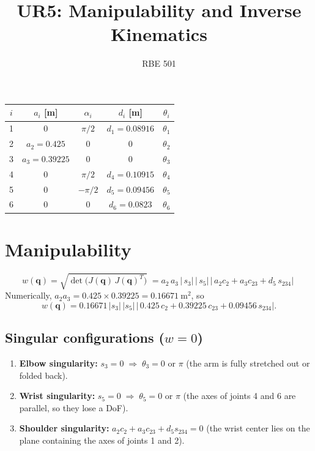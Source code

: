 \documentclass[11pt]{article}
\title{UR5: Manipulability and Inverse Kinematics}
\author{RBE 501}
\date{}
\begin{document}
\maketitle

\begin{table}[h]
\centering
\begin{tabular}{ccccc}
\toprule
$i$ & $a_i$ [m] & $\alpha_i$ & $d_i$ [m] & $\theta_i$\\
\midrule
1 & 0       & $\pi/2$  & $d_1=0.08916$ & $\theta_1$\\
2 & $a_2=0.425$   & 0 & 0 & $\theta_2$\\
3 & $a_3=0.39225$ & 0 & 0 & $\theta_3$\\
4 & 0       & $\pi/2$  & $d_4=0.10915$ & $\theta_4$\\
5 & 0       & $-\pi/2$ & $d_5=0.09456$ & $\theta_5$\\
6 & 0       & 0        & $d_6=0.0823$  & $\theta_6$\\
\bottomrule
\end{tabular}
\end{table}

\section{Manipulability}

\begin{equation}
  w(\mathbf q)=\sqrt{\det\!\big(J(\mathbf q)\,J(\mathbf q)^{T}\big)}
  \boxed{\;
  =a_2\,a_3\,\bigl|\,s_3\bigr|\,\bigl|\,s_5\bigr|\,
  \bigl|\,a_2 c_2 + a_3 c_{23} + d_5\, s_{234}\bigr|
  \;}
\end{equation}
Numerically, $a_2a_3 = 0.425\times0.39225 = 0.16671\ \text{m}^2$, so
\begin{equation}
  w(\mathbf q)=0.16671\,\lvert s_3\rvert\,\lvert s_5\rvert\,
  \bigl|\,0.425\,c_2 + 0.39225\,c_{23} + 0.09456\,s_{234}\bigr| .
\end{equation}

\subsection*{Singular configurations ($w=0$)}
\begin{enumerate}
  \item \textbf{Elbow singularity:} $s_3=0\;\Rightarrow\;\theta_3=0$ or $\pi$
        (the arm is fully stretched out or folded back).
  \item \textbf{Wrist singularity:} $s_5=0\;\Rightarrow\;\theta_5=0$ or $\pi$
        (the axes of joints 4 and 6 are parallel, so they lose a DoF).
  \item \textbf{Shoulder singularity:} $a_2c_2+a_3c_{23}+d_5s_{234}=0$
        (the wrist center lies on the plane containing the axes of joints 1 and 2).
\end{enumerate}
\end{document}

